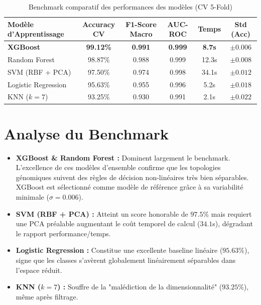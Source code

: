 \documentclass[12pt,a4paper]{report}
\begin{document}
\begin{table}[H]
\centering
\small
\caption{Benchmark comparatif des performances des mod\`eles (CV 5-Fold)}
\label{tab:benchmark}
\begin{tabularx}{\textwidth}{lccccc}
\toprule
\textbf{Mod\`ele d'Apprentissage} & \textbf{Accuracy CV} & \textbf{F1-Score Macro} & \textbf{AUC-ROC} & \textbf{Temps} & \textbf{Std (Acc)} \\
\midrule
\rowcolor{successbg!50}\textbf{XGBoost} & \textbf{99.12\%} & \textbf{0.991} & \textbf{0.999} & \textbf{8.7s} & $\mathbf{\pm 0.006}$ \\
Random Forest & 98.87\% & 0.988 & 0.999 & 12.3s & $\pm 0.008$ \\
SVM (RBF + PCA) & 97.50\% & 0.974 & 0.998 & 34.1s & $\pm 0.012$ \\
Logistic Regression & 95.63\% & 0.955 & 0.996 & 5.2s & $\pm 0.018$ \\
KNN ($k=7$) & 93.25\% & 0.930 & 0.991 & 2.1s & $\pm 0.022$ \\
\bottomrule
\end{tabularx}
\end{table}

\section{Analyse du Benchmark}
\begin{itemize}[label=\textbullet]
    \item \textbf{XGBoost \& Random Forest :} Dominent largement le benchmark. L'excellence de ces mod\`eles d'ensemble confirme que les topologies g\'enomiques suivent des r\`egles de d\'ecision non-lin\'eaires tr\`es bien s\'eparables. XGBoost est s\'electionn\'e comme mod\`ele de r\'ef\'erence gr\^ace \`a sa variabilit\'e minimale ($\sigma = 0.006$).
    \item \textbf{SVM (RBF + PCA) :} Atteint un score honorable de $97.5\%$ mais requiert une PCA pr\'ealable augmentant le coût temporel de calcul ($34.1$s), d\'egradant le rapport performance/temps.
    \item \textbf{Logistic Regression :} Constitue une excellente baseline lin\'eaire ($95.63\%$), signe que les classes s'av\`erent globalement lin\'eairement s\'eparables dans l'espace r\'eduit.
    \item \textbf{KNN ($k=7$) :} Souffre de la "mal\'ediction de la dimensionnalit\'e" ($93.25\%$), m\^eme apr\`es filtrage.
\end{itemize}
\end{document}
